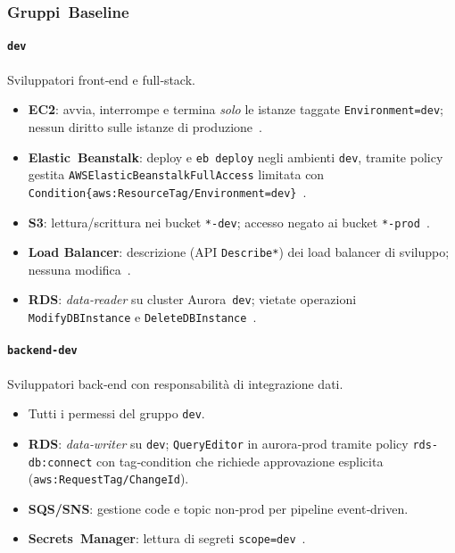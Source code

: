 \subsubsection{Gruppi Baseline}
\label{subsubsec:gruppi_base}

\paragraph{\texttt{dev}}%
Sviluppatori front‑end e full‑stack.  
\begin{itemize}
  \item \textbf{EC2}: avvia, interrompe e termina \emph{solo} le istanze taggate \texttt{Environment=dev};
        nessun diritto sulle istanze di produzione \cite{AWSEC2IAM}.  
  \item \textbf{Elastic Beanstalk}: deploy e \verb|eb deploy| negli ambienti \texttt{dev},
        tramite policy gestita \texttt{AWSElasticBeanstalkFullAccess} limitata con
        \texttt{Condition\{aws:ResourceTag/Environment=dev\}} \cite{AWSEBRole}.  
  \item \textbf{S3}: lettura/scrittura nei bucket \texttt{*-dev}; accesso negato ai bucket \texttt{*-prod} \cite{AWSS3Security}.  
  \item \textbf{Load Balancer}: descrizione (API \texttt{Describe*}) dei load balancer di
        sviluppo; nessuna modifica \cite{AWSELBIAM}.  
  \item \textbf{RDS}: \emph{data‑reader} su cluster Aurora \texttt{dev}; vietate operazioni \texttt{ModifyDBInstance} e \texttt{DeleteDBInstance} \cite{AWSRDSIAM}.  
\end{itemize}

\paragraph{\texttt{backend‑dev}}%
Sviluppatori back‑end con responsabilità di integrazione dati.  
\begin{itemize}
  \item Tutti i permessi del gruppo \texttt{dev}.  
  \item \textbf{RDS}: \emph{data‑writer} su \texttt{dev}; \texttt{QueryEditor} in aurora‑prod tramite
        policy \texttt{rds-db:connect} con tag‑condition che richiede
        approvazione esplicita (\texttt{aws:RequestTag/ChangeId}).  
  \item \textbf{SQS/SNS}: gestione code e topic non‑prod per pipeline event‑driven.  
  \item \textbf{Secrets Manager}: lettura di segreti \texttt{scope=dev} \cite{AWSIAMBestPractices}.  
\end{itemize}

